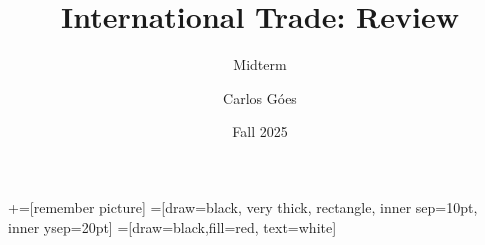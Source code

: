 \documentclass[notes,11pt, aspectratio=169, xcolor=table]{beamer}
\title[]{International Trade: Review}
\subtitle[]{Midterm}
\author[Góes]
{Carlos Góes\inst{1}}
\date{Fall 2025}
\institute[GWU]{\inst{1} George Washington University }
\begin{document}
\newcommand\marktopleft[1]{%
    \tikz[overlay,remember picture] 
        \node (marker-#1-a) at (-.3em,.3em) {};%
}
\newcommand\markbottomright[2]{%
    \tikz[overlay,remember picture] 
        \node (marker-#1-b) at (0em,0em) {};%
}
+=[remember picture] 
 =[draw=black, very thick, rectangle, inner sep=10pt, inner ysep=20pt]
 =[draw=black,fill=red, text=white]















\frame{\titlepage}
\addtocounter{framenumber}{-1}



\end{document}
